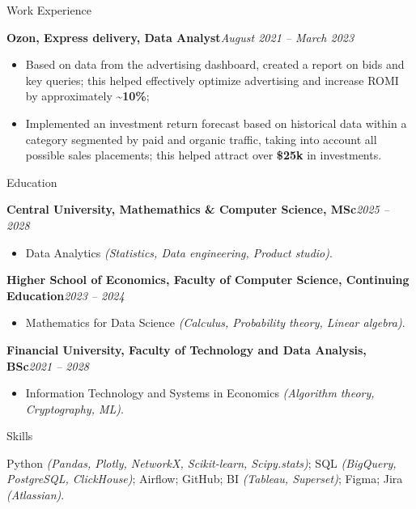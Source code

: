 \documentclass[]{mcdowellcv}
\renewenvironment{cvsubsection}[2]{%
  \begin{adjustwidth}{\subsectionmargin}{\subsectionmargin}%
    {\bfseries #1}\hfill #2\par\vspace{0.5em}%
}{%
  \end{adjustwidth}%
  \vspace*{\aftersubsectionspace}%
}
\begin{document}
\begin{cvsection}{\Large Work Experience}
		\begin{cvsubsection}{Ozon, Express delivery, Data Analyst}{\textit{August 2021 -- March 2023}}
			\begin{itemize}
				\item Based on data from the advertising dashboard, created a report on bids and key queries; this helped effectively optimize advertising and increase ROMI by approximately \textbf{\textasciitilde 10\%};
				\item Implemented an investment return forecast based on historical data within a category segmented by paid and organic traffic, taking into account all possible sales placements; this helped attract over \textbf{\$25k} in investments.
			\end{itemize}
		\end{cvsubsection}
	\end{cvsection}
	
	\begin{cvsection}{\Large Education}
		\begin{cvsubsection}{Central University, Mathemathics \& Computer Science, MSc}{\textit{2025 -- 2028}}
			\begin{itemize}
				\item Data Analytics \textit{(Statistics, Data engineering, Product studio)}.
			\end{itemize}
		\end{cvsubsection}
		\begin{cvsubsection}{Higher School of Economics, Faculty of Computer Science, Continuing Education}{\textit{2023 -- 2024}}
			\begin{itemize}
				\item Mathematics for Data Science \textit{(Calculus, Probability theory, Linear algebra)}.
			\end{itemize}
		\end{cvsubsection}
		\begin{cvsubsection}{Financial University, Faculty of Technology and Data Analysis, BSc}{\textit{2021 -- 2028}}
			\begin{itemize}
				\item Information Technology and Systems in Economics \textit{(Algorithm theory, Cryptography, ML)}.
			\end{itemize}
		\end{cvsubsection}
	\end{cvsection}
	
	\begin{cvsection}{\Large Skills}
	\vspace{-1.55em}
	\begin{cvsubsection}{}{}{}  
		Python \textit{(Pandas, Plotly, NetworkX, Scikit-learn, Scipy.stats)}; SQL \textit{(BigQuery, PostgreSQL, ClickHouse)}; Airflow; GitHub; BI \textit{(Tableau, Superset)}; Figma; Jira \textit{(Atlassian)}.
	\end{cvsubsection}
	\end{cvsection}
	
\end{document}
